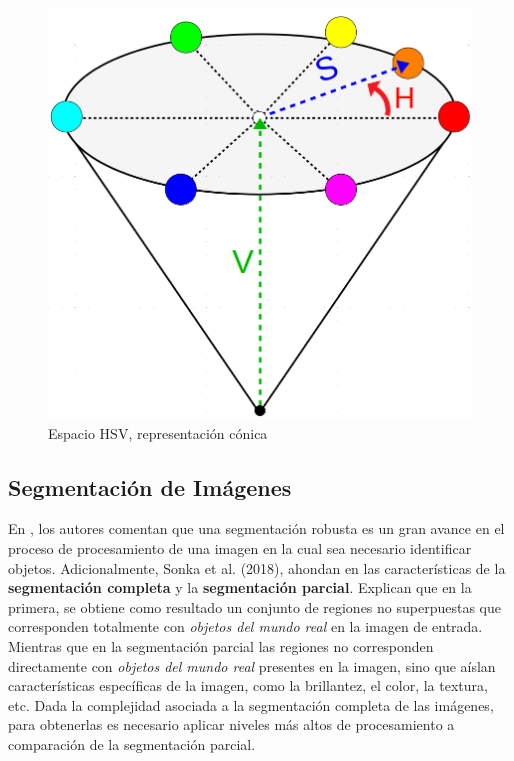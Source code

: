 \begin{figure}[H]
\centering
\includegraphics[scale=0.2]{Figures/ConoHSV.png}
    \caption{Espacio HSV, representación cónica}
    \label{fig:HSV_Space}
\end{figure}


\subsection{Segmentación de Imágenes}

En \cite{gonzalez_digital_2002}, los autores comentan que una segmentación robusta es un gran avance en el proceso de procesamiento de una imagen en la cual sea necesario identificar objetos. Adicionalmente, 
Sonka et al. (2018)\cite{sonka_image_2008}, ahondan en las características de la \textbf{segmentación completa} y la \textbf{segmentación parcial}. Explican que en la primera, se obtiene como resultado un conjunto de regiones no superpuestas que corresponden totalmente con \textit{objetos del mundo real} en la imagen de entrada. Mientras que en la segmentación parcial las regiones no corresponden directamente con \textit{objetos del mundo real} presentes en la imagen, sino que aíslan características específicas de la imagen, como la brillantez, el color, la textura, etc. Dada la complejidad asociada a la segmentación completa de las imágenes, para obtenerlas es necesario aplicar niveles más altos de procesamiento a comparación de la segmentación parcial.



